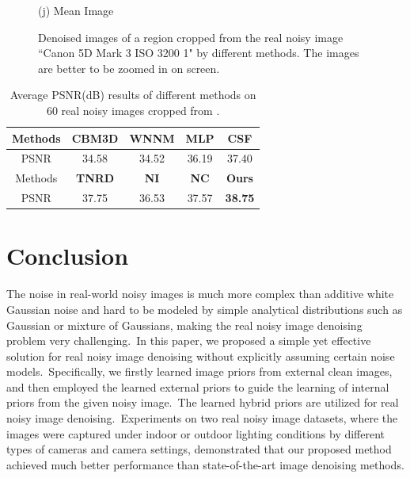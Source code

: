 \documentclass[10pt,twocolumn,letterpaper]{article}
\begin{document}
\begin{figure}
{\begin{minipage}[t]{0.195\textwidth}
{\footnotesize (j) Mean Image \cite{crosschannel2016}}
\end{minipage}
}\vspace{-0.5mm}
\caption{Denoised images of a region cropped from the real noisy image ``Canon 5D Mark 3 ISO 3200 1" \cite{crosschannel2016} by different methods. The images are better to be zoomed in on screen.}
\label{fig7}
\vspace{0.5mm}
\end{figure}

\begin{table}\vspace{1.5mm}
\caption{Average PSNR(dB) results of different methods on 60 real noisy images cropped from \cite{crosschannel2016}.}
\vspace{-3mm}
\label{tab3}
\begin{center}
\renewcommand\arraystretch{1}
\begin{tabular}{|c||c|c|c|c|}
\hline
 Methods& \textbf{CBM3D}&\textbf{WNNM}&\textbf{MLP}&\textbf{CSF}
\\
\hline
PSNR &   34.58 & 34.52 & 36.19 & 37.40
\\
\hline
Methods& \textbf{TNRD} & \textbf{NI} & \textbf{NC} &\textbf{Ours} 
\\
\hline
PSNR & 37.75  & 36.53 & 37.57 & {\textbf{{ 38.75}}}
\\
\hline
\end{tabular}
\end{center}\vspace{-2.5mm}
\end{table}


\section{Conclusion}

The noise in real-world noisy images is much more complex than additive white Gaussian noise and hard to be modeled by simple analytical distributions such as Gaussian or mixture of Gaussians, making the real noisy image denoising problem very challenging.\ In this paper, we proposed a simple yet effective solution for real noisy image denoising without explicitly assuming certain noise models.\ Specifically, we firstly learned image priors from external clean images, and then employed the learned external priors to guide the learning of internal priors from the given noisy image.\ The learned hybrid priors are utilized for real noisy image denoising.\ Experiments on two real noisy image datasets, where the images were captured under indoor or outdoor lighting conditions by different types of cameras and camera settings, demonstrated that our proposed method achieved much better performance than state-of-the-art image denoising methods.



{
\small


}
\end{document}
